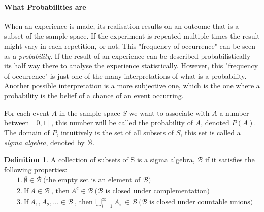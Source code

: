 \documentclass[
  oneside,
  11pt, a4paper,
  footinclude=true,
  headinclude=true,
  cleardoublepage=empty
]{scrbook}
\theoremstyle{definition}
\newtheorem{definition}{Definition}[section]
\theoremstyle{definition}
\begin{document}
	        \paragraph{What Probabilities are}
            
                When an experience is made, its realisation results on an outcome that is a subset of the sample space. If the experiment is repeated multiple times the result might vary in each repetition, or not. This "frequency of occurrence" can be seen as a \emph{probability}. If the result of an experience can be described probabilistically its half way there to analyse the experience statistically. However, this "frequency of occurrence" is just one of the many interpretations of what is a probability. Another possible interpretation is a more subjective one, which is the one where a probability is the belief of a chance of an event occurring.
                
                For each event $A$ in the sample space $S$ we want to associate with $A$ a number between $[0, 1]$, this number will be called the probability of $A$, denoted $P(A)$. The domain of $P$, intuitively is the set of all subsets of $S$, this set is called a \emph{sigma algebra}, denoted by $\mathscr{B}$.%
                
                \begin{definition}{A collection of subsets of S is a sigma algebra, $\mathscr{B}$ if it satisfies the following properties:}
                \begin{align*}
                    &1.\ \emptyset \in \mathscr{B}\ \text{(the empty set is an element of $\mathscr{B}$)}\\
                    &2.\ \text{If}\ A \in \mathscr{B}\ \text{, then}\ A^c \in \mathscr{B}\  \text{($\mathscr{B}$ is closed under complementation)}\\
                    &3.\ \text{If}\ A_1, A_2, ... \in \mathscr{B}\ \text{, then}\ \bigcup_{i=1}^{\infty} A_i \ \in \mathscr{B}\ \text{($\mathscr{B}$ is closed under countable unions)}
                \end{align*}{}
                \end{definition}{}
                
\end{document}
